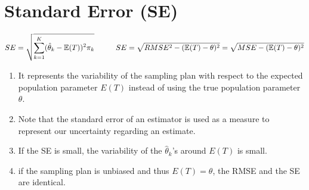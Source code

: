 \section{Standard Error (SE)}

\[
    \hfill
    SE = \sqrt{
        \displaystyle\sum_{k=1}^{K}
        (\hat{\theta}_k - \mathbb{E}(T))^2\pi_k
    }
    \hspace{1cm}
    SE = \sqrt{RMSE^2 - (\mathbb{E}(T) - \theta)^2}
    = \sqrt{MSE - (\mathbb{E}(T) - \theta)^2}
    \hfill
\]

\begin{enumerate}
    \item It represents the variability of the sampling plan with respect to the expected population parameter $E(T)$ instead of using the true population parameter $\theta$.

    \item Note that the standard error of an estimator is used as a measure to represent our uncertainty regarding an estimate.

    \item If the SE is small, the variability of the $\hat{\theta}_k$’s around $E(T)$ is small.

    \item if the sampling plan is unbiased and thus $E(T) = \theta$, the RMSE and the SE are identical.

\end{enumerate}




















